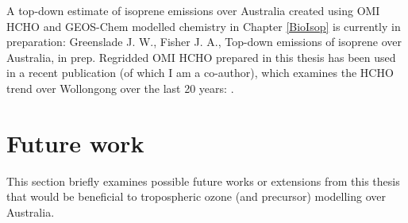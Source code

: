  A top-down estimate of isoprene emissions over Australia created using OMI HCHO and GEOS-Chem modelled chemistry in Chapter \ref{BioIsop} is currently in preparation: Greenslade J. W., Fisher J. A., Top-down emissions of isoprene over Australia, in prep.
  Regridded OMI HCHO prepared in this thesis has been used in a recent publication (of which I am a co-author), which examines the HCHO trend over Wollongong over the last 20 years: .
  
  
\section{Future work}
  \label{Conclusions:futurework}
  
  This section briefly examines possible future works or extensions from this thesis that would be beneficial to tropospheric ozone (and precursor) modelling over Australia.
  
